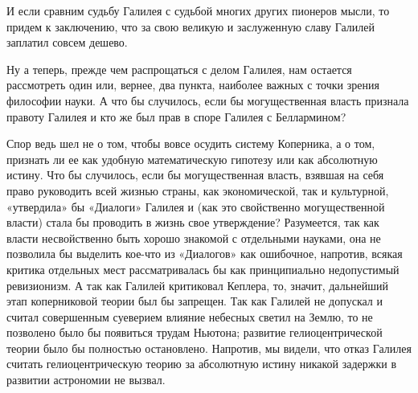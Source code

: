 И если сравним судьбу Галилея с судьбой многих других пионеров мысли, то придем
к заключению, что за свою великую и заслуженную славу Галилей заплатил совсем
дешево.

Ну а теперь, прежде чем распрощаться с делом Галилея, нам остается рассмотреть
один или, вернее, два пункта, наиболее важных с точки зрения философии науки. А
что бы случилось, если бы могущественная власть признала правоту Галилея и кто
же был прав в споре Галилея с Беллармином?

Спор ведь шел не о том, чтобы вовсе осудить систему Коперника, а о том,
признать ли ее как удобную математическую гипотезу или как абсолютную истину.
Что бы случилось, если бы могущественная власть, взявшая на себя право
руководить всей жизнью страны, как экономической, так и культурной, «утвердила»
бы «Диалоги» Галилея и (как это свойственно могущественной власти) стала бы
проводить в жизнь свое утверждение? Разумеется, так как власти несвойственно
быть хорошо знакомой с отдельными науками, она не позволила бы выделить кое-что
из «Диалогов» как ошибочное, напротив, всякая критика отдельных мест
рассматривалась бы как принципиально недопустимый ревизионизм. А так как
Галилей критиковал Кеплера, то, значит, дальнейший этап коперниковой теории был
бы запрещен. Так как Галилей не допускал и считал совершенным суеверием влияние
небесных светил на Землю, то не позволено было бы появиться трудам Ньютона;
развитие гелиоцентрической теории было бы полностью остановлено. Напротив, мы
видели, что отказ Галилея считать гелиоцентрическую теорию за абсолютную истину
никакой задержки в развитии астрономии не вызвал.


